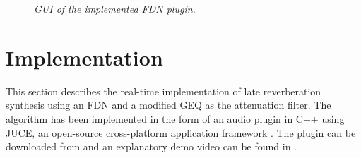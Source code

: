 \documentclass[twoside,a4paper]{article}
\begin{document}
\begin{figure}[ht!]
    \centering
     \hfill
     \hfill
    \caption{\textit{GUI of the implemented FDN plugin.}}
    \label{fig:GUIboth}
\end{figure}


\section{Implementation}\label{sec:implementation}

This section describes the real-time implementation of late reverberation synthesis using an FDN and a modified GEQ as the attenuation filter. The algorithm has been implemented in the form of an audio plugin  in C++ using JUCE, an open-source cross-platform application framework \cite{juce}. The plugin can be downloaded from \cite{plugin} and an explanatory demo video can be found in \cite{demo}.
\end{document}

